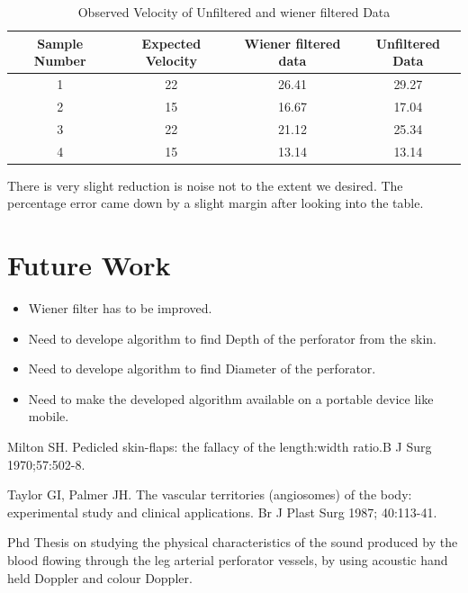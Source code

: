 \documentclass[BTech]{nitkdiss}
\begin{document}
\begin {table}
\caption {Observed Velocity of Unfiltered and wiener filtered Data}
\begin{center}
 \begin{tabular}{||c| c| c| c||} 
 \hline
 Sample Number & Expected Velocity & Wiener filtered data &  Unfiltered Data \\ [0.5ex] 
 \hline\hline
 1 & 22 & 26.41 & 29.27 \\ 
 \hline
 2 & 15 & 16.67 & 17.04 \\
 \hline
 3 & 22 & 21.12 & 25.34 \\
 \hline
 4 & 15 & 13.14 & 13.14 \\ [1ex] 
 \hline
\end{tabular}
\end{center}
\end{table}


\hspace{0.4cm} There is very slight reduction is noise not to the extent we desired. The percentage error came down by a slight margin after looking into the table.


\section{Future Work}

\begin{itemize}
\item Wiener filter has to be improved.
\item Need to develope algorithm to find Depth of the perforator from the skin.
\item Need to develope algorithm to find Diameter of the perforator.
\item Need to make the developed algorithm available on a portable device like mobile.
\end{itemize}


\begin{thebibliography}{9}

\item Milton SH. Pedicled skin-flaps: the fallacy of the length:width ratio.B J Surg 1970;57:502-8.
\item Taylor GI, Palmer JH. The vascular territories (angiosomes) of the body: experimental study and clinical applications. Br J Plast Surg 1987; 40:113-41.
\item Phd Thesis on studying the physical characteristics of the sound produced by the blood flowing through the leg arterial perforator vessels, by using acoustic hand held Doppler and colour Doppler.

\end{thebibliography}
\end{document}
